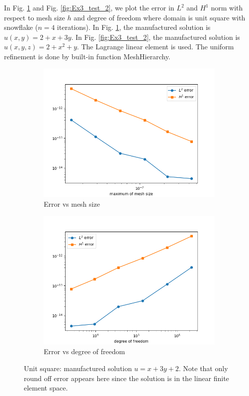 \documentclass[12pt]{article}%
\theoremstyle{plain}
\numberwithin{equation}{section}
\begin{document}
In Fig. \ref{fig:Ex3_test} and Fig.  \ref{fig:Ex3_test_2}, we plot the error in $L^2$ and $H^1$ norm with respect to mesh size $h$ and degree of freedom where domain is unit square with snowflake ($n=4$ iterations). In Fig. \ref{fig:Ex3_test}, the manufactured solution is $u(x,y)= 2+x+3y$. In Fig. \ref{fig:Ex3_test_2}, the manufactured solution is $u(x,y,z)= 2+x^2+y$. The Lagrange linear element is used. The uniform refinement is done by built-in function MeshHierarchy.

\begin{figure}[H]%
    \centering
         \begin{subfigure}[h]{0.45\linewidth}
          \caption{Error vs mesh size}
\includegraphics[width=\linewidth]{figures/Ex3/Ex3_test.png}
\end{subfigure}
  \begin{subfigure}[h]{0.45\linewidth}
   \caption{Error vs degree of freedom}
\includegraphics[width=\linewidth]{figures/Ex3/Ex3_test_dof.png}
\end{subfigure}
  \caption{Unit square: manufactured solution $u=x+3y+2$. Note that only round off error appears here since the solution is in the linear finite element space.}
  \label{fig:Ex3_test}
 \end{figure}
\end{document}
